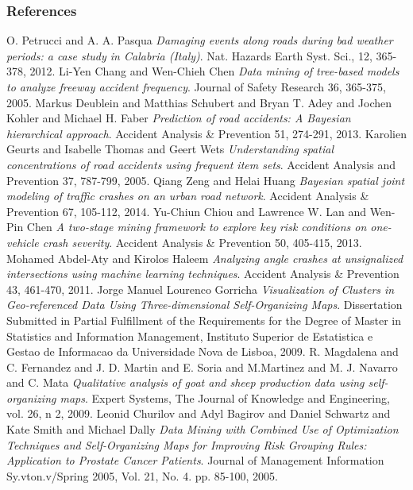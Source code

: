 \documentclass[hyperref={pdfpagelabels=true}]{beamer}
\begin{document}
\begin{frame}[allowframebreaks]
\frametitle{References}
\tiny{
 \begin{thebibliography}{ab}
   O. Petrucci and A. A. Pasqua {\em Damaging events along roads during bad weather periods: a case study in Calabria (Italy)}. Nat. Hazards Earth Syst. Sci., 12, 365-378, 2012. 
   Li-Yen Chang and Wen-Chieh Chen {\em Data mining of tree-based models to analyze freeway accident frequency}. Journal of Safety Research 36, 365-375, 2005.  
   Markus Deublein and Matthias Schubert and Bryan T. Adey and Jochen Kohler and Michael H. Faber {\em Prediction of road accidents: A Bayesian hierarchical approach}. Accident Analysis \& Prevention 51, 274-291, 2013.
   Karolien Geurts and Isabelle Thomas and Geert Wets {\em Understanding spatial concentrations of road accidents using frequent item sets}. Accident Analysis and Prevention 37, 787-799, 2005.
   Qiang Zeng and Helai Huang {\em Bayesian spatial joint modeling of traffic crashes on an urban road network}. Accident Analysis \& Prevention 67, 105-112, 2014.
   Yu-Chiun Chiou and Lawrence W. Lan and Wen-Pin Chen {\em A two-stage mining framework to explore key risk conditions on one-vehicle crash severity}. Accident Analysis \& Prevention 50, 405-415, 2013.
   Mohamed Abdel-Aty and Kirolos Haleem {\em Analyzing angle crashes at unsignalized intersections using machine learning techniques}. Accident Analysis \& Prevention 43, 461-470, 2011.
   Jorge Manuel Lourenco Gorricha {\em Visualization of Clusters in Geo-referenced Data Using Three-dimensional Self-Organizing Maps}. Dissertation Submitted in Partial Fulfillment of the Requirements for the Degree of Master in Statistics and Information Management, Instituto Superior de Estatistica e Gestao de Informacao da Universidade Nova de Lisboa, 2009.
   R. Magdalena and C. Fernandez and J. D. Martin and E. Soria and M.Martinez and M. J. Navarro and C. Mata {\em Qualitative analysis of goat and sheep production data using self-organizing maps}. Expert Systems, The Journal of Knowledge and Engineering, vol. 26, n 2, 2009.
   Leonid Churilov and Adyl Bagirov and Daniel Schwartz and Kate Smith and Michael Dally {\em Data Mining with Combined Use of Optimization Techniques and Self-Organizing Maps for Improving Risk Grouping Rules: Application to Prostate Cancer Patients}. Journal of Management Information Sy.vton.v/Spring 2005, Vol. 21, No. 4. pp. 85-100, 2005.  

\end{thebibliography}}
\end{frame}
\end{document}

